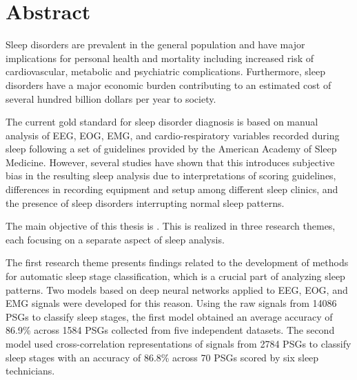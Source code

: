 \begingroup
\let\clearpage\relax
\let\cleardoublepage\relax
\let\cleardoublepage\relax

\chapter*{Abstract}
\vfill

Sleep disorders are prevalent in the general population and have major implications for personal health and mortality including increased risk of cardiovascular, metabolic and psychiatric complications.
Furthermore, sleep disorders have a major economic burden contributing to an estimated cost of several hundred billion dollars per year to society.

The current gold standard for sleep disorder diagnosis is based on manual analysis of \ac{EEG}, \ac{EOG}, \ac{EMG}, and cardio-respiratory variables recorded during sleep following a set of guidelines provided by the American Academy of Sleep Medicine. 
However, several studies have shown that this introduces subjective bias in the resulting sleep analysis due to interpretations of scoring guidelines, differences in recording equipment and setup among different sleep clinics, and the presence of sleep disorders interrupting normal sleep patterns.

The main objective of this thesis is \objective. 
This is realized in three research themes, each focusing on a separate aspect of sleep analysis.

The first research theme presents findings related to the development of methods for automatic sleep stage classification, which is a crucial part of analyzing sleep patterns.
Two models based on deep neural networks applied to \ac{EEG}, \ac{EOG}, and \ac{EMG} signals were developed for this reason.
Using the raw signals from \num{14086} \acp{PSG} to classify sleep stages, the first model obtained an average accuracy of 86.9\% across 1584 \acp{PSG} collected from five independent datasets.
The second model used cross-correlation representations of signals from \num{2784} \acp{PSG} to classify sleep stages with an accuracy of 86.8\% across 70 \acp{PSG} scored by six sleep technicians.

